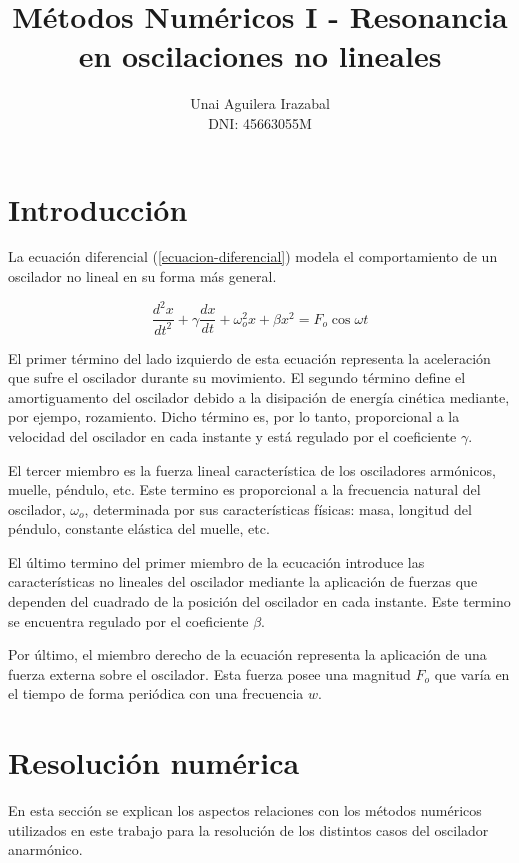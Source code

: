\documentclass[11pt]{article}
\title{Métodos Numéricos I - Resonancia en oscilaciones no lineales}
\author{Unai Aguilera Irazabal\\ DNI: 45663055M}
\begin{document}
\maketitle
\tableofcontents

\pagebreak
\renewcommand{\tablename}{Tabla}

\section{Introducción}
La ecuación diferencial (\ref{ecuacion-diferencial}) modela el comportamiento de
un oscilador no lineal en su forma más general.

\begin{equation}
\label{ecuacion-diferencial}
	 \frac{d^2 x}{dt^2} + \gamma\frac{dx}{dt} + \omega_{o}^2x 
	 + \beta{}x^2 = F_{o}\cos{\omega{}t}
\end{equation}

El primer término del lado izquierdo de esta ecuación representa la aceleración
que sufre el oscilador durante su movimiento. El segundo término define el 
amortiguamento del oscilador debido a la disipación de energía cinética mediante,
por ejempo, rozamiento. Dicho término es, por lo tanto, proporcional a la
velocidad del oscilador en cada instante y está regulado por el coeficiente
$\gamma$.

El tercer miembro es la fuerza lineal característica de los osciladores armónicos,
muelle, péndulo, etc. Este termino es proporcional a la frecuencia natural del
oscilador, $\omega_{o}$, determinada por sus características físicas: masa,
longitud del péndulo, constante elástica del muelle, etc.

El último termino del primer miembro de la ecucación introduce las 
características no lineales del oscilador mediante la aplicación de fuerzas que
dependen del cuadrado de la posición del oscilador en cada instante. Este
termino se encuentra regulado por el coeficiente $\beta$.

Por último, el miembro derecho de la ecuación representa la aplicación de una
fuerza externa sobre el oscilador. Esta fuerza posee una magnitud $F_{o}$ que
varía en el tiempo de forma periódica con una frecuencia $w$.

\section{Resolución numérica}
En esta sección se explican los aspectos relaciones con los métodos numéricos
utilizados en este trabajo para la resolución de los distintos casos del
oscilador anarmónico.
\end{document}
